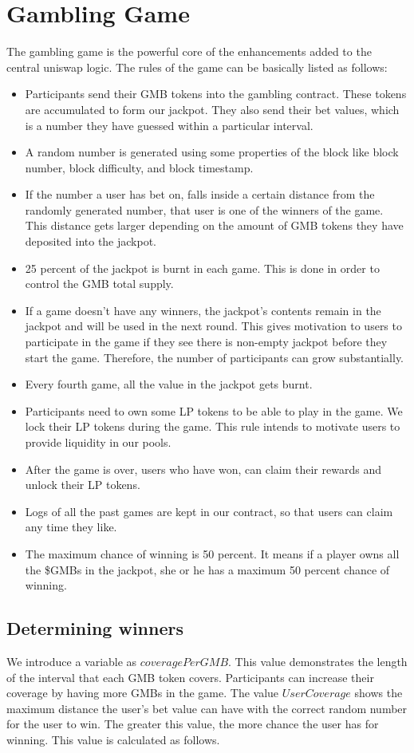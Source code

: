 \documentclass{article}
\begin{document}
\section{Gambling Game}
The gambling game is the powerful core of the enhancements added to the central uniswap logic. The rules of the game can be basically listed as follows:
\begin{itemize}
    \item Participants send their GMB tokens into the gambling contract. These tokens are accumulated to form our jackpot. They also send their bet values, which is a number they have guessed within a particular interval.
    \item A random number is generated using some properties of the block like block number, block difficulty, and block timestamp.
    \item If the number a user has bet on, falls inside a certain distance from the randomly generated number, that user is one of the winners of the game. This distance gets larger depending on the amount of GMB tokens they have deposited into the jackpot.
    \item 25 percent of the jackpot is burnt in each game. This is done in order to control the GMB total supply.
    \item If a game doesn't have any winners, the jackpot's contents remain in the jackpot and will be used in the next round. This gives motivation to users to participate in the game if they see there is non-empty jackpot before they start the game. Therefore, the number of participants can grow substantially. 
    \item Every fourth game, all the value in the jackpot gets burnt.
    \item Participants need to own some LP tokens to be able to play in the game. We lock their LP tokens during the game. This rule intends to motivate users to provide liquidity in our pools.
    \item After the game is over, users who have won, can claim their rewards and unlock their LP tokens. 
    \item Logs of all the past games are kept in our contract, so that users can claim any time they like.
    \item The maximum chance of winning is 50 percent. It means if a player owns all the \$GMBs in the jackpot, she or he has a maximum 50 percent chance of winning. 
\end{itemize}

\subsection{Determining winners}
We introduce a variable as $coveragePerGMB$. This value demonstrates the length of the interval that each GMB token covers. Participants can increase their coverage by having more GMBs in the game. The value $UserCoverage$ shows the maximum distance the user's bet value can have with the correct random number for the user to win. The greater this value, the more chance the user has for winning. This value is calculated as follows. 
\end{document}
